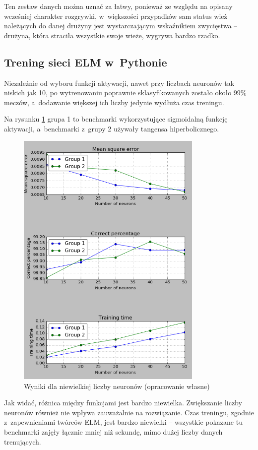 \documentclass[pl]{minipw} %
\begin{document}
Ten zestaw danych można uznać za łatwy, ponieważ ze względu na opisany wcześniej charakter rozgrywki, w~większości przypadków sam status wież należących do danej drużyny jest wystarczającym wskaźnikiem zwycięstwa -- drużyna, która straciła wszystkie swoje wieże, wygrywa bardzo rzadko.
\subsection{Trening sieci ELM w~Pythonie}
Niezależnie od wyboru funkcji aktywacji, nawet przy liczbach neuronów tak niskich jak 10, po wytrenowaniu poprawnie sklasyfikowanych zostało około 99\% meczów, a~dodawanie większej ich liczby jedynie wydłuża czas treningu. 
\label{python-dota}

Na rysunku \ref{wyniki_dota2_python} grupa 1 to benchmarki wykorzystujące sigmoidalną funkcję aktywacji, a~benchmarki z~grupy 2 używały tangensa hiperbolicznego.

\begin{figure}[H]
\centering
\includegraphics[width=0.8\textwidth]{wyniki_dota2_python.png}
\caption[Wyniki dla niewielkiej liczby neuronów]{Wyniki dla niewielkiej liczby neuronów (opracowanie własne)}
\label{wyniki_dota2_python}
\end{figure}
Jak widać, różnica między funkcjami jest bardzo niewielka. Zwiększanie liczby neuronów również nie wpływa zauważalnie na rozwiązanie. Czas treningu, zgodnie z~zapewnieniami twórców ELM, jest bardzo niewielki -- wszystkie pokazane tu benchmarki zajęły łącznie mniej niż sekundę, mimo dużej liczby danych trenujących. 
\end{document}
